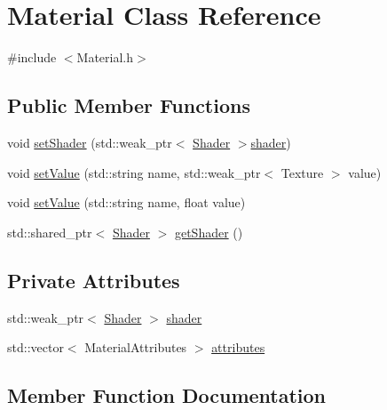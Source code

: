 \hypertarget{class_material}{}\section{Material Class Reference}
\label{class_material}


{\ttfamily \#include $<$Material.\+h$>$}

\subsection*{Public Member Functions}
\begin{DoxyCompactItemize}
\item 
void \hyperlink{class_material_af22f2c958c2bc0f1e34f0b965df7bc6f}{set\+Shader} (std\+::weak\+\_\+ptr$<$ \hyperlink{class_shader}{Shader} $>$\hyperlink{class_material_a0acf8a8f7e55ddddcef3391e68ea74c5}{shader})
\item 
void \hyperlink{class_material_a73831d8a1a14e3987af00278c43f15d5}{set\+Value} (std\+::string name, std\+::weak\+\_\+ptr$<$ Texture $>$ value)
\item 
void \hyperlink{class_material_a051524839454843ed6f41ddc19da7704}{set\+Value} (std\+::string name, float value)
\item 
std\+::shared\+\_\+ptr$<$ \hyperlink{class_shader}{Shader} $>$ \hyperlink{class_material_a7a24a6eae2a3065e4411646e9211bde6}{get\+Shader} ()
\end{DoxyCompactItemize}
\subsection*{Private Attributes}
\begin{DoxyCompactItemize}
\item 
std\+::weak\+\_\+ptr$<$ \hyperlink{class_shader}{Shader} $>$ \hyperlink{class_material_a0acf8a8f7e55ddddcef3391e68ea74c5}{shader}
\item 
std\+::vector$<$ Material\+Attributes $>$ \hyperlink{class_material_a90f35060d118063ea0ef682ad7b36fac}{attributes}
\end{DoxyCompactItemize}


\subsection{Member Function Documentation}
\mbox{\label{class_material_a7a24a6eae2a3065e4411646e9211bde6}} 
